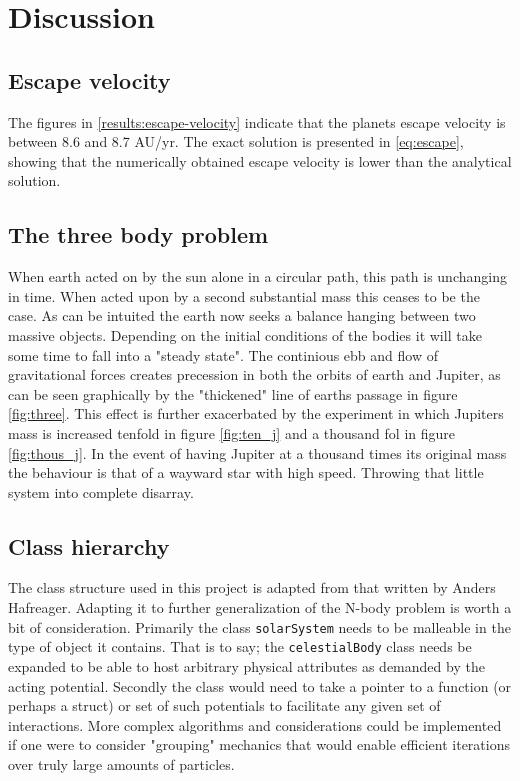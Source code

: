 \section{Discussion}
\subsection{Escape velocity}
The figures in \ref{results:escape-velocity} indicate that the planets escape velocity is between
8.6 and 8.7 AU/yr. The exact solution is presented in \ref{eq:escape}, showing that the numerically
obtained escape velocity is lower than the analytical solution.


\subsection{The three body problem}
When earth acted on by the sun alone in a circular path, this path is unchanging in time. When acted upon by a second substantial mass this ceases to be the case. As can be intuited the earth now seeks a balance hanging between two massive objects. Depending on the initial conditions of the bodies it will take some time to fall into a "steady state". The continious ebb and flow of gravitational forces creates precession in both the orbits of earth and Jupiter, as can be seen graphically by the "thickened" line of earths passage in figure \ref{fig:three}. This effect is further exacerbated by  the experiment in which Jupiters mass is increased tenfold in figure \ref{fig:ten_j} and a thousand fol in figure \ref{fig:thous_j}.
In the event of having Jupiter at a thousand times its original mass the behaviour is that of a wayward star with high speed. Throwing that little system into complete disarray.   

\subsection{Class hierarchy}

The class structure used in this project is adapted from that written by Anders Hafreager. Adapting it to further generalization of the N-body problem is worth a bit of consideration. Primarily the class \lstinline{solarSystem} needs to be malleable  in the type of object it contains. That is to say; the \lstinline{celestialBody} class needs be expanded to be able to host arbitrary physical attributes as demanded by the acting potential. Secondly the class would need to take a pointer to a function (or perhaps a struct) or set of such potentials to facilitate any given set of interactions. More complex algorithms and considerations could be implemented if one were to consider "grouping" mechanics that would enable efficient iterations over truly large amounts of particles.